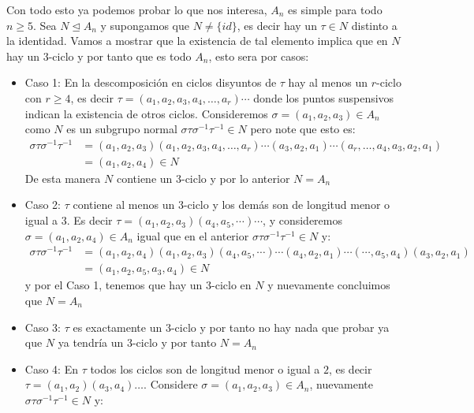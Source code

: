 \begin{homeworkProblem}
\begin{solucion}
            Con todo esto ya podemos probar lo que nos interesa, $A_n$ es simple para todo $n\geq 5$.
            Sea $N\trianglelefteq A_n$ y supongamos que $N\neq\{id\}$, es decir hay un $\tau\in N$ distinto a la identidad. Vamos a mostrar que la existencia de tal elemento implica que en $N$ hay un 3-ciclo y por tanto que es todo $A_n$, esto sera por casos:
            \begin{itemize}
                \item Caso 1: En la descomposición en ciclos disyuntos de $\tau$ hay al menos un $r$-ciclo con $r\geq 4$, es decir $\tau=(a_1,a_2,a_3,a_4,\dots,a_r)\cdots$ donde los puntos suspensivos indican la existencia de otros ciclos. Consideremos $\sigma=(a_1,a_2,a_3)\in A_n$ como $N$ es un subgrupo normal $\sigma\tau\sigma^{-1}\tau^{-1}\in N$ pero note que esto es:
                \begin{align*}
                   \sigma\tau\sigma^{-1}\tau^{-1}&=(a_1,a_2,a_3)(a_1,a_2,a_3,a_4,\dots,a_r)\cdots(a_3,a_2,a_1)\cdots(a_r,\dots,a_4,a_3,a_2,a_1)\\
                   &=(a_1,a_2,a_4)\in N
                \end{align*}
                De esta manera $N$ contiene un 3-ciclo y por lo anterior $N=A_n$
                \item Caso 2: $\tau$ contiene al menos un 3-ciclo y los demás son de longitud menor o igual a 3. Es decir $\tau=(a_1,a_2,a_3)(a_4,a_5,\cdots)\cdots$, y consideremos $\sigma=(a_1,a_2,a_4)\in A_n$ igual que en el anterior $\sigma\tau\sigma^{-1}\tau^{-1}\in N$ y:
                \begin{align*}
                    \sigma\tau\sigma^{-1}\tau^{-1}&=(a_1,a_2,a_4)(a_1,a_2,a_3)(a_4,a_5,\cdots)\cdots(a_4,a_2,a_1)\cdots(\cdots,a_5,a_4)(a_3,a_2,a_1)\\
                    &=(a_1,a_2,a_5,a_3,a_4)\in N
                \end{align*}
                y por el Caso 1, tenemos que hay un 3-ciclo en $N$ y nuevamente concluimos que $N=A_n$
                \item Caso 3: $\tau$ es exactamente un 3-ciclo y por tanto no hay nada que probar ya que $N$ ya tendría un 3-ciclo y por tanto $N=A_n$
                \item Caso 4: En $\tau$ todos los ciclos son de longitud menor o igual a $2$, es decir $\tau=(a_1,a_2)(a_3,a_4)\dotsc$. Considere $\sigma=(a_1,a_2,a_3)\in A_n$, nuevamente $\sigma\tau\sigma^{-1}\tau^{-1}\in N$ y:
                \begin{align*}

\end{align*}
\end{itemize}
\end{solucion}
\end{homeworkProblem}
